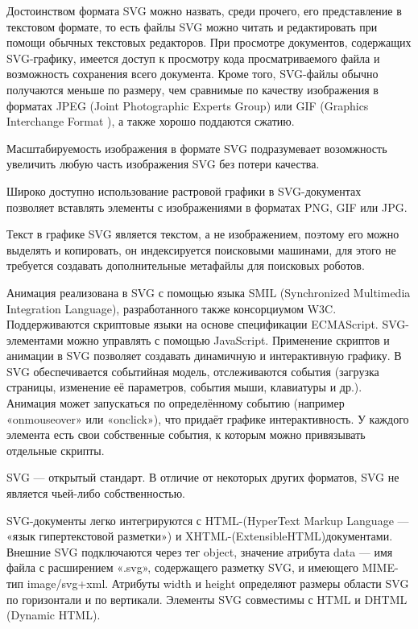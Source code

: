 Достоинством формата SVG можно назвать, среди прочего, его представление в текстовом формате, то есть файлы SVG можно читать и редактировать при помощи обычных текстовых редакторов. При просмотре документов, содержащих SVG-графику, имеется доступ к просмотру кода просматриваемого файла и возможность сохранения всего документа. Кроме того, SVG-файлы обычно получаются меньше по размеру, чем сравнимые по качеству изображения в форматах JPEG (Joint Photographic Experts Group) или GIF (Graphics Interchange Format ), а также хорошо поддаются сжатию.

Масштабируемость изображения в формате SVG подразумевает возомжность увеличить любую часть изображения SVG без потери качества.

Широко доступно использование растровой графики в SVG-документах позволяет вставлять элементы с изображениями в форматах PNG, GIF или JPG.

Текст в графике SVG является текстом, а не изображением, поэтому его можно выделять и копировать, он индексируется поисковыми машинами, для этого не требуется создавать дополнительные метафайлы для поисковых роботов.

Анимация реализована в SVG с помощью языка SMIL (Synchronized Multimedia Integration Language), разработанного также консорциумом W3C. Поддерживаются скриптовые языки на основе спецификации ECMAScript. SVG-элементами можно управлять с помощью JavaScript. Применение скриптов и анимации в SVG позволяет создавать динамичную и интерактивную графику. В SVG обеспечивается событийная модель, отслеживаются события (загрузка страницы, изменение её параметров, события мыши, клавиатуры и др.). Анимация может запускаться по определённому событию (например «onmouseover» или «onclick»), что придаёт графике интерактивность. У каждого элемента есть свои собственные события, к которым можно привязывать отдельные скрипты.

SVG — открытый стандарт. В отличие от некоторых других форматов, SVG не является чьей-либо собственностью.

SVG-документы легко интегрируются с HTML-(HyperText Markup Language — «язык гипертекстовой разметки») и XHTML-(ExtensibleHTML)документами. Внешние SVG подключаются через тег object, значение атрибута data — имя файла с расширением «.svg», содержащего разметку SVG, и имеющего MIME-тип image/svg+xml. Атрибуты width и height определяют размеры области SVG по горизонтали и по вертикали. Элементы SVG совместимы с HTML и DHTML (Dynamic HTML).


